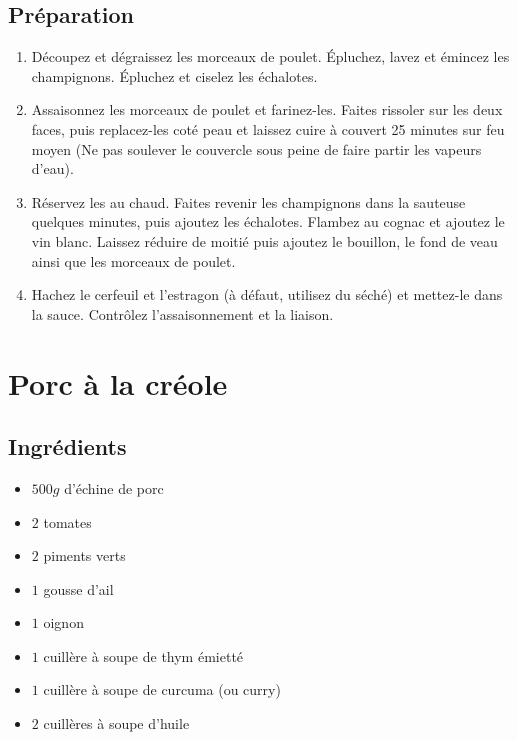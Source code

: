 \subsection*{Préparation}
\begin{enumerate}
\item Découpez et dégraissez les morceaux de poulet. Épluchez, lavez et émincez les champignons. Épluchez et ciselez les échalotes.
\item Assaisonnez les morceaux de poulet et farinez-les. Faites rissoler sur les deux faces, puis replacez-les coté peau et laissez cuire à couvert 25 minutes sur feu moyen (Ne pas soulever le couvercle sous peine de faire partir les vapeurs d'eau).
\item Réservez les au chaud. Faites revenir les champignons dans la sauteuse quelques minutes, puis ajoutez les échalotes. Flambez au cognac et ajoutez le vin blanc. Laissez réduire de moitié puis ajoutez le bouillon, le fond de veau ainsi que les morceaux de poulet.
\item  Hachez le cerfeuil et l'estragon (à défaut, utilisez du séché) et mettez-le dans la sauce. Contrôlez l'assaisonnement et la liaison.
\end{enumerate}

\newpage
\section{Porc à la créole}%
\subsection*{Ingrédients}
\begin{itemize}
\item $500 \unit{g}$ d'échine de porc
\item $2$ tomates
\item $2$ piments verts
\item $1$ gousse d'ail
\item $1$ oignon
\item $1$ cuillère à soupe de thym émietté
\item $1$ cuillère à soupe de curcuma (ou curry)
\item $2$ cuillères à soupe d'huile
\end{itemize}

